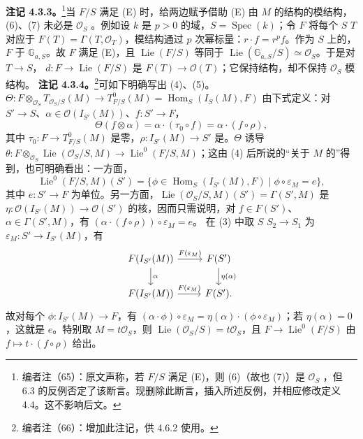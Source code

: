 \textbf{注记 4.3.3。}\footnote{编者注（65）：原文声称，若 $F/S$ 满足 (E)，则 (6)（故也 (7)）是 $\mathcal O_S$ ，但 6.3 的反例否定了该断言。现删除此断言，插入所述反例，并相应修改定义 4.4。这不影响后文。}当 $F/S$ 满足 (E) 时，给两边赋予借助 (E) 由 $M$ 的结构的模结构， (6)、(7) 未必是 $\mathcal O_S$ 。例如设 $k$ 是 $p>0$ 的域，$S=\operatorname{Spec}(k)$；令 $F$ 将每个 $S$  $T$ 对应于 $F(T)=\Gamma(T,\mathcal O_T)$，模结构通过 $p$ 次幂标量：$r\cdot f=r^pf$。作为 $S$ 上的，$F$ 于 $\mathbb G_{a,S}$。故 $F$ 满足 (E)，且 $\operatorname{Lie}(F/S)$ 等同于 $\operatorname{Lie}(\mathbb G_{a,S}/S)\simeq\mathcal O_S$。于是对 $T\to S$， $d:F\to\operatorname{Lie}(F/S)$ 是 $F(T)\to\mathcal O(T)$；它保持结构，却不保持 $\mathcal O_S$ 模结构。
\textbf{注记 4.3.4。}\footnote{编者注（66）：增加此注记，供 4.6.2 使用。}可如下明确写出 (4)、(5)。 $\Theta:F\otimes_{\mathcal O_S}T_{\mathcal O_S/S}(M)\to T^0_{F/S}(M)=\operatorname{Hom}_S(I_S(M),F)$ 由下式定义：对 $S'\to S$、$\alpha\in\mathcal O(I_{S'}(M))$、$f:S'\to F$，
\[\Theta(f\otimes\alpha)=\alpha\cdot(\tau_0\circ f)=\alpha\cdot(f\circ\rho),\]
其中 $\tau_0:F\to T^0_{F/S}(M)$ 是零，$\rho:I_{S'}(M)\to S'$ 是。$\Theta$ 诱导 $\theta:F\otimes_{\mathcal O_S}\operatorname{Lie}(\mathcal O_S/S,M)\to\operatorname{Lie}^0(F/S,M)$；这由 (4) 后所说的“关于 $M$ 的”得到，也可明确看出：一方面，
\[\operatorname{Lie}^0(F/S,M)(S')=\{\phi\in\operatorname{Hom}_S(I_{S'}(M),F)\mid\phi\circ\varepsilon_M=e\},\]
其中 $e:S'\to F$ 为单位。另一方面，$\operatorname{Lie}(\mathcal O_S/S,M)(S')=\Gamma(S',M)$ 是 $\eta:\mathcal O(I_{S'}(M))\to\mathcal O(S')$ 的核，因而只需说明，对 $f\in F(S')$、$\alpha\in\Gamma(S',M)$，有 $(\alpha\cdot(f\circ\rho))\circ\varepsilon_M=e$。
在 (3) 中取 $S$  $S_2\to S_1$ 为 $\varepsilon_M:S'\to I_{S'}(M)$，有
\[\begin{tikzcd}
F(I_{S'}(M))\arrow[r,"F(\varepsilon_M)"]\arrow[d,"\alpha"]&F(S')\arrow[d,"\eta(\alpha)"]\\
F(I_{S'}(M))\arrow[r,"F(\varepsilon_M)"]&F(S').
\end{tikzcd}\]
故对每个 $\phi:I_{S'}(M)\to F$，有 $(\alpha\cdot\phi)\circ\varepsilon_M=\eta(\alpha)\cdot(\phi\circ\varepsilon_M)$；若 $\eta(\alpha)=0$，这就是 $e$。特别取 $M=t\mathcal O_S$，则 $\operatorname{Lie}(\mathcal O_S/S)=t\mathcal O_S$，且 $F\to\operatorname{Lie}^0(F/S)$ 由 $f\mapsto t\cdot(f\circ\rho)$ 给出。

